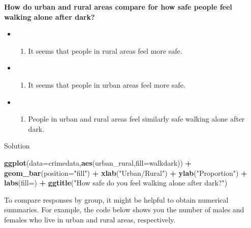 \documentclass[
]{book}
\newenvironment{Shaded}{\begin{snugshade}}{\end{snugshade}}
\newcommand{\AttributeTok}[1]{\textcolor[rgb]{0.13,0.29,0.53}{#1}}
\newcommand{\FunctionTok}[1]{\textcolor[rgb]{0.13,0.29,0.53}{\textbf{#1}}}
\newcommand{\NormalTok}[1]{#1}
\newcommand{\SpecialCharTok}[1]{\textcolor[rgb]{0.81,0.36,0.00}{\textbf{#1}}}
\newcommand{\StringTok}[1]{\textcolor[rgb]{0.31,0.60,0.02}{#1}}
\providecommand{\tightlist}{%
  \setlength{\itemsep}{0pt}\setlength{\parskip}{0pt}}
\begin{document}
\textbf{How do urban and rural areas compare for how safe people feel walking alone after dark?}

\begin{itemize}
\item
  \begin{enumerate}
  \def\labelenumi{(\Alph{enumi})}
  \tightlist
  \item
    It seems that people in rural areas feel more safe.\\
  \end{enumerate}
\item
  \begin{enumerate}
  \def\labelenumi{(\Alph{enumi})}
  \setcounter{enumi}{1}
  \tightlist
  \item
    It seems that people in urban areas feel more safe.\\
  \end{enumerate}
\item
  \begin{enumerate}
  \def\labelenumi{(\Alph{enumi})}
  \setcounter{enumi}{2}
  \tightlist
  \item
    People in urban and rural areas feel similarly safe walking alone after dark.
  \end{enumerate}
\end{itemize}

Solution

\begin{Shaded}
\begin{Highlighting}[]
\FunctionTok{ggplot}\NormalTok{(}\AttributeTok{data=}\NormalTok{crimedata,}\FunctionTok{aes}\NormalTok{(urban\_rural,}\AttributeTok{fill=}\NormalTok{walkdark)) }\SpecialCharTok{+} \FunctionTok{geom\_bar}\NormalTok{(}\AttributeTok{position=}\StringTok{"fill"}\NormalTok{) }\SpecialCharTok{+}
  \FunctionTok{xlab}\NormalTok{(}\StringTok{"Urban/Rural"}\NormalTok{) }\SpecialCharTok{+} \FunctionTok{ylab}\NormalTok{(}\StringTok{"Proportion"}\NormalTok{) }\SpecialCharTok{+}
  \FunctionTok{labs}\NormalTok{(}\AttributeTok{fill=}\StringTok{\textquotesingle{}\textquotesingle{}}\NormalTok{) }\SpecialCharTok{+} \FunctionTok{ggtitle}\NormalTok{(}\StringTok{"How safe do you feel walking alone after dark?"}\NormalTok{)}
\end{Highlighting}
\end{Shaded}

To compare responses by group, it might be helpful to obtain numerical summaries. For example, the code below shows you the number of males and females who live in urban and rural areas, respectively.
\end{document}
